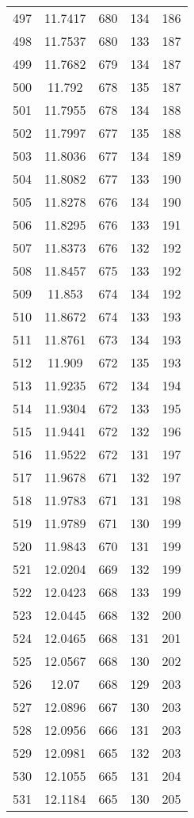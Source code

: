 \documentclass[12pt,a4paper]{article}
\begin{document}
\begin{tabular}{r|cccc}
	497 & 11.7417 & 680 & 134 & 186 \\
	498 & 11.7537 & 680 & 133 & 187 \\
	499 & 11.7682 & 679 & 134 & 187 \\
	500 & 11.792 & 678 & 135 & 187 \\
	501 & 11.7955 & 678 & 134 & 188 \\
	502 & 11.7997 & 677 & 135 & 188 \\
	503 & 11.8036 & 677 & 134 & 189 \\
	504 & 11.8082 & 677 & 133 & 190 \\
	505 & 11.8278 & 676 & 134 & 190 \\
	506 & 11.8295 & 676 & 133 & 191 \\
	507 & 11.8373 & 676 & 132 & 192 \\
	508 & 11.8457 & 675 & 133 & 192 \\
	509 & 11.853 & 674 & 134 & 192 \\
	510 & 11.8672 & 674 & 133 & 193 \\
	511 & 11.8761 & 673 & 134 & 193 \\
	512 & 11.909 & 672 & 135 & 193 \\
	513 & 11.9235 & 672 & 134 & 194 \\
	514 & 11.9304 & 672 & 133 & 195 \\
	515 & 11.9441 & 672 & 132 & 196 \\
	516 & 11.9522 & 672 & 131 & 197 \\
	517 & 11.9678 & 671 & 132 & 197 \\
	518 & 11.9783 & 671 & 131 & 198 \\
	519 & 11.9789 & 671 & 130 & 199 \\
	520 & 11.9843 & 670 & 131 & 199 \\
	521 & 12.0204 & 669 & 132 & 199 \\
	522 & 12.0423 & 668 & 133 & 199 \\
	523 & 12.0445 & 668 & 132 & 200 \\
	524 & 12.0465 & 668 & 131 & 201 \\
	525 & 12.0567 & 668 & 130 & 202 \\
	526 & 12.07 & 668 & 129 & 203 \\
	527 & 12.0896 & 667 & 130 & 203 \\
	528 & 12.0956 & 666 & 131 & 203 \\
	529 & 12.0981 & 665 & 132 & 203 \\
	530 & 12.1055 & 665 & 131 & 204 \\
	531 & 12.1184 & 665 & 130 & 205 \\

\end{tabular}
\end{document}
